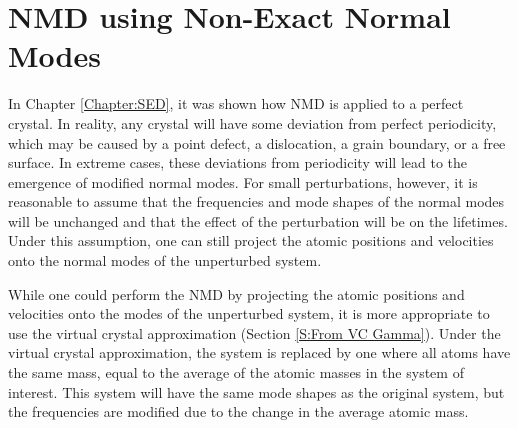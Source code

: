 % 

\section{\label{A:NMD XCORR}NMD using Non-Exact Normal Modes}

In Chapter \ref{Chapter:SED}, it was shown how NMD is 
applied to a perfect crystal. In reality, any crystal will have some 
deviation from perfect periodicity, which may be caused by a point defect, 
a dislocation, a grain boundary, or a free surface. In extreme cases, 
these deviations from periodicity will lead to the emergence of modified 
normal modes. For small perturbations, however, it is reasonable to
assume that the frequencies and mode shapes of the normal modes will 
be unchanged and that the effect of the perturbation will be on the 
lifetimes. Under this assumption, one can still project the atomic 
positions and velocities onto the normal modes of the unperturbed system.

While one could perform the NMD by projecting 
the atomic positions and velocities onto the modes of the unperturbed 
system, it is more appropriate to use the virtual crystal approximation 
(Section \ref{S:From VC Gamma}). 
Under the virtual 
crystal approximation, the system is replaced by one where all atoms 
have the same mass, equal to the average of the atomic masses in the 
system of interest. This system will have the same mode shapes as the 
original system, but the frequencies are modified due to the change 
in the average atomic mass.

